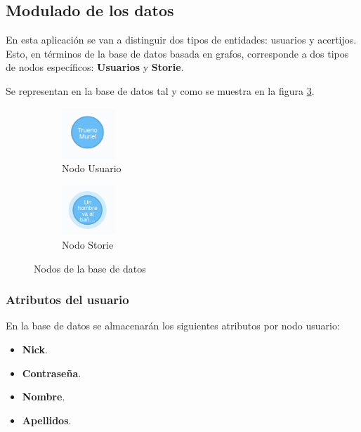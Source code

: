 \subsection{Modulado de los datos}

En esta aplicación se van a distinguir dos tipos de entidades: usuarios y acertijos. Esto, en términos de la base de datos basada en grafos, corresponde a dos tipos de nodos específicos: \textbf{Usuarios} y \textbf{Storie}.


Se representan en la base de datos tal y como se muestra en la figura \ref{fig::nodos}. 

\begin{figure}[hbtp] \centering
\begin{subfigure}{.6\textwidth}
     \centerline{\includegraphics[width=2cm]{figuras/usuario.png}}
    \caption{Nodo Usuario} 
    \label{fig::usernode}
\end{subfigure}
\begin{subfigure}{.6\textwidth}
     \centerline{\includegraphics[width=2cm]{figuras/storie.png}}
    \caption{Nodo Storie} 
    \label{fig::storynode}
\end{subfigure}
\caption{Nodos de la base de datos }
\label{fig::nodos}
\end{figure}

\subsubsection{Atributos del usuario}

En la base de datos se almacenarán los siguientes atributos por nodo usuario:

\begin{itemize}
    \item \textbf{Nick}.
    \item \textbf{Contraseña}.
    \item \textbf{Nombre}.
    \item \textbf{Apellidos}.
\end{itemize}


